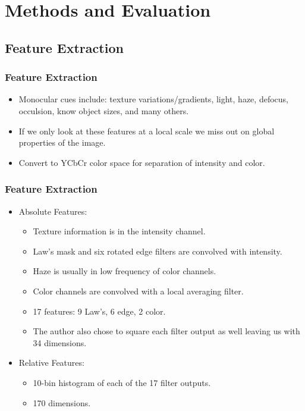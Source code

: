 \documentclass[handout]{beamer}
\newcommand{\vitem}{\vfill\item}
\begin{document}
\section{Methods and Evaluation}
\subsection{Feature Extraction}

\begin{frame}[t]\frametitle{Feature Extraction}
    \begin{itemize}
        \item Monocular cues include: texture variations/gradients, light, haze, defocus, occulsion, know object sizes, and many others.
        \vitem<+-> If we only look at these features at a local scale we miss out on global properties of the image.
        \vitem<+-> Convert to YCbCr color space for separation of intensity and color.
    \end{itemize}
\end{frame}

\begin{frame}[t]\frametitle{Feature Extraction}
    \begin{itemize}
        \item<+-> Absolute Features:
        \begin{itemize}
            \item<+-> Texture information is in the intensity channel.
            \vitem<+-> Law's mask and six rotated edge filters are convolved with intensity.
            \vitem<+-> Haze is usually in low frequency of color channels.
            \vitem<+-> Color channels are convolved with a local averaging filter.
            \vitem<+-> 17 features: 9 Law's, 6 edge, 2 color.
            \vitem<+-> The author also chose to square each filter output as well leaving us with 34 dimensions.
        \end{itemize}
        \item<+-> Relative Features:
        \begin{itemize}
            \vitem 10-bin histogram of each of the 17 filter outputs.
            \vitem 170 dimensions.
        \end{itemize}
    \end{itemize}
\end{frame}
\end{document}
